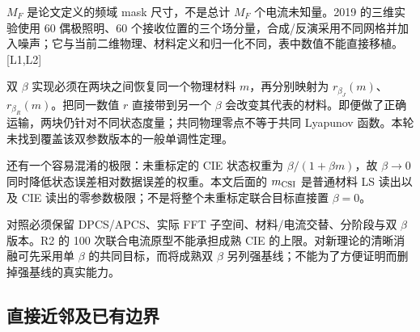 \documentclass[10pt,a4paper]{article}
\begin{document}
\(M_F\) 是论文定义的频域 mask 尺寸，不是总计 \(M_F\) 个电流未知量。2019
的三维实验使用 60 偶极照明、60
个接收位置的三个场分量，合成/反演采用不同网格并加入噪声；它与当前二维物理、材料定义和归一化不同，表中数值不能直接移植。{[}L1,L2{]}

双 \(\beta\) 实现必须在两块之间恢复同一个物理材料 \(m\)，再分别映射为
\(r_{\beta_J}(m)\)、\(r_{\beta_R}(m)\)。把同一数值 \(r\) 直接带到另一个
\(\beta\)
会改变其代表的材料。即便做了正确运输，两块仍针对不同状态度量；共同物理零点不等于共同
Lyapunov 函数。本轮未找到覆盖该双参数版本的一般单调性定理。

还有一个容易混淆的极限：未重标定的 CIE 状态权重为
\(\beta/(1+\beta m)\)，故 \(\beta\to0\)
同时降低状态误差相对数据误差的权重。本文后面的 \(m_{\rm CSI}\)
是普通材料 LS 读出以及 CIE
读出的零参数极限；不是将整个未重标定联合目标直接置 \(\beta=0\)。

对照必须保留 DPCS/APCS、实际 FFT 子空间、材料/电流交替、分阶段与双
\(\beta\) 版本。R2 的 100 次联合电流原型不能承担成熟 CIE
的上限。对新理论的清晰消融可先采用单 \(\beta\) 的共同目标，而将成熟双
\(\beta\) 另列强基线；不能为了方便证明而删掉强基线的真实能力。

\hypertarget{ux76f4ux63a5ux8fd1ux90bbux53caux5df2ux6709ux8fb9ux754c}{%
\subsection{直接近邻及已有边界}\label{ux76f4ux63a5ux8fd1ux90bbux53caux5df2ux6709ux8fb9ux754c}}
\end{document}
